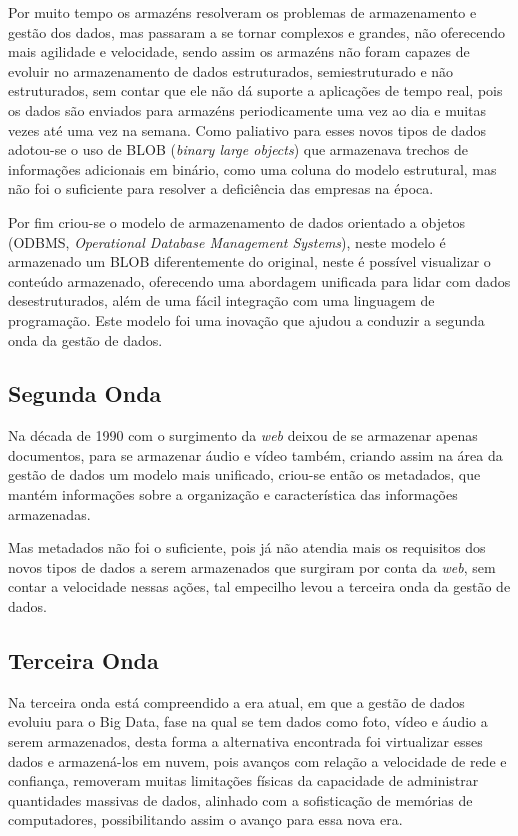 Por muito tempo os armazéns resolveram os problemas de armazenamento e gestão dos dados, mas passaram a se tornar complexos e grandes, não oferecendo mais agilidade e velocidade, sendo assim os armazéns não foram capazes de evoluir no armazenamento de dados estruturados, semiestruturado e não estruturados, sem contar que ele não dá suporte a aplicações de tempo real, pois os dados são enviados para armazéns periodicamente uma vez ao dia e muitas vezes até uma vez na semana. Como paliativo para esses novos tipos de dados adotou-se o uso de BLOB (\textit{binary large objects}) que armazenava trechos de informações adicionais em binário, como uma coluna do modelo estrutural, mas não foi o suficiente para resolver a deficiência das empresas na época.~\cite{leigos} 

Por fim criou-se o modelo de armazenamento de dados orientado a objetos (ODBMS, \textit{Operational Database Management Systems}), neste modelo é armazenado um BLOB diferentemente do original, neste é possível visualizar o conteúdo armazenado, oferecendo uma abordagem unificada para lidar com dados desestruturados, além de uma fácil integração com uma linguagem de programação. Este modelo foi uma inovação que ajudou a conduzir a segunda onda da gestão de dados.~\cite{leigos}

\subsection{Segunda Onda}
\label{subsec:segundaonda}
Na década de 1990 com o surgimento da \textit{web} deixou de se armazenar apenas documentos, para se armazenar áudio e vídeo também, criando assim na área da gestão de dados um modelo mais unificado, criou-se então os metadados, que mantém informações sobre a organização e característica das informações armazenadas.~\cite{leigos}

Mas metadados não foi o suficiente, pois já não atendia mais os requisitos dos novos tipos de dados a serem armazenados que surgiram por conta da \textit{web}, sem contar a velocidade nessas ações, tal empecilho levou a terceira onda da gestão de dados.~\cite{leigos}

\subsection{Terceira Onda}
\label{subsec:terceiraonda}
Na terceira onda está compreendido a era atual, em que a gestão de dados evoluiu para o Big Data, fase na qual se tem dados como foto, vídeo e áudio a serem armazenados, desta forma a alternativa encontrada foi virtualizar esses dados e armazená-los em nuvem, pois avanços com relação a velocidade de rede e confiança, removeram muitas limitações físicas da capacidade de administrar quantidades massivas de dados, alinhado com a sofisticação de memórias de computadores, possibilitando assim o avanço para essa nova era.~\cite{leigos}

